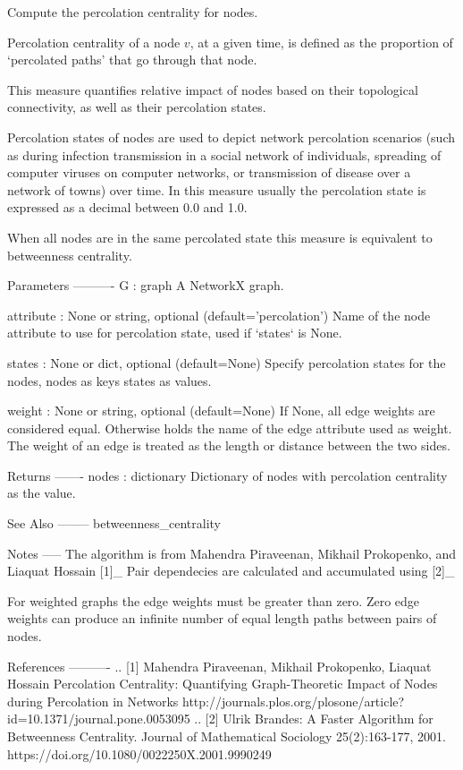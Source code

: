 \begin{DoxyVerb}Compute the percolation centrality for nodes.

Percolation centrality of a node $v$, at a given time, is defined
as the proportion of ‘percolated paths’ that go through that node.

This measure quantifies relative impact of nodes based on their
topological connectivity, as well as their percolation states.

Percolation states of nodes are used to depict network percolation
scenarios (such as during infection transmission in a social network
of individuals, spreading of computer viruses on computer networks, or
transmission of disease over a network of towns) over time. In this
measure usually the percolation state is expressed as a decimal
between 0.0 and 1.0.

When all nodes are in the same percolated state this measure is
equivalent to betweenness centrality.

Parameters
----------
G : graph
  A NetworkX graph.

attribute : None or string, optional (default='percolation')
  Name of the node attribute to use for percolation state, used
  if `states` is None.

states : None or dict, optional (default=None)
  Specify percolation states for the nodes, nodes as keys states
  as values.

weight : None or string, optional (default=None)
  If None, all edge weights are considered equal.
  Otherwise holds the name of the edge attribute used as weight.
  The weight of an edge is treated as the length or distance between the two sides.


Returns
-------
nodes : dictionary
   Dictionary of nodes with percolation centrality as the value.

See Also
--------
betweenness_centrality

Notes
-----
The algorithm is from Mahendra Piraveenan, Mikhail Prokopenko, and
Liaquat Hossain [1]_
Pair dependecies are calculated and accumulated using [2]_

For weighted graphs the edge weights must be greater than zero.
Zero edge weights can produce an infinite number of equal length
paths between pairs of nodes.

References
----------
.. [1] Mahendra Piraveenan, Mikhail Prokopenko, Liaquat Hossain
   Percolation Centrality: Quantifying Graph-Theoretic Impact of Nodes
   during Percolation in Networks
   http://journals.plos.org/plosone/article?id=10.1371/journal.pone.0053095
.. [2] Ulrik Brandes:
   A Faster Algorithm for Betweenness Centrality.
   Journal of Mathematical Sociology 25(2):163-177, 2001.
   https://doi.org/10.1080/0022250X.2001.9990249
\end{DoxyVerb}
 
